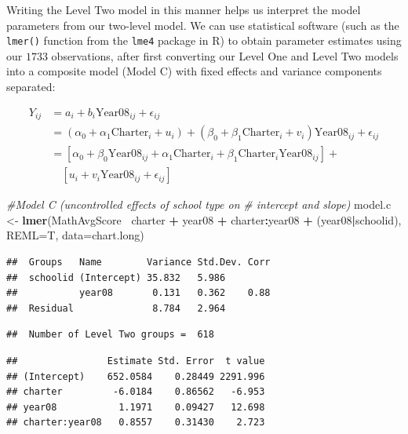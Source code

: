 \documentclass[
]{krantz}
\newenvironment{Shaded}{\begin{snugshade}}{\end{snugshade}}
\newcommand{\CommentTok}[1]{\textcolor[rgb]{0.37,0.37,0.37}{\textit{#1}}}
\newcommand{\DataTypeTok}[1]{\textcolor[rgb]{0.27,0.27,0.27}{#1}}
\newcommand{\KeywordTok}[1]{\textcolor[rgb]{0.27,0.27,0.27}{\textbf{#1}}}
\newcommand{\NormalTok}[1]{#1}
\newcommand{\OperatorTok}[1]{\textcolor[rgb]{0.43,0.43,0.43}{\textbf{#1}}}
\newcommand{\StringTok}[1]{\textcolor[rgb]{0.5,0.5,0.5}{#1}}
\begin{document}
Writing the Level Two model in this manner helps us interpret the model parameters from our two-level model. We can use statistical software (such as the \texttt{lmer()} function from the \texttt{lme4} package in R) to obtain parameter estimates using our \(1733\) observations, after first converting our Level One and Level Two models into a composite model (Model C) with fixed effects and variance components separated:

\begin{align*}
Y_{ij} & = a_{i} + b_{i}\textrm{Year08}_{ij}+ \epsilon_{ij} \\
       & = (\alpha_{0} + \alpha_{1}\textrm{Charter}_i +u_{i}) + (\beta_{0} + \beta_{1}\textrm{Charter}_i + v_{i})\textrm{Year08}_{ij} + \epsilon_{ij} \\
       & = [\alpha_{0} + \beta_{0}\textrm{Year08}_{ij} +\alpha_{1}\textrm{Charter}_i+ \beta_{1}\textrm{Charter}_i\textrm{Year08}_{ij}] + \\
       & \quad [u_{i} + v_{i}\textrm{Year08}_{ij} + \epsilon_{ij}]
\end{align*}

\begin{Shaded}
\begin{Highlighting}[]
\CommentTok{#Model C (uncontrolled effects of school type on }
\CommentTok{#   intercept and slope)}
\NormalTok{model.c <-}\StringTok{ }\KeywordTok{lmer}\NormalTok{(MathAvgScore}\OperatorTok{~}\StringTok{ }\NormalTok{charter }\OperatorTok{+}\StringTok{ }\NormalTok{year08 }\OperatorTok{+}\StringTok{ }
\StringTok{  }\NormalTok{charter}\OperatorTok{:}\NormalTok{year08 }\OperatorTok{+}\StringTok{ }\NormalTok{(year08}\OperatorTok{|}\NormalTok{schoolid), }
  \DataTypeTok{REML=}\NormalTok{T, }\DataTypeTok{data=}\NormalTok{chart.long)}
\end{Highlighting}
\end{Shaded}

\begin{verbatim}
##  Groups   Name        Variance Std.Dev. Corr
##  schoolid (Intercept) 35.832   5.986        
##           year08       0.131   0.362    0.88
##  Residual              8.784   2.964
\end{verbatim}

\begin{verbatim}
##  Number of Level Two groups =  618
\end{verbatim}

\begin{verbatim}
##                Estimate Std. Error  t value
## (Intercept)    652.0584    0.28449 2291.996
## charter         -6.0184    0.86562   -6.953
## year08           1.1971    0.09427   12.698
## charter:year08   0.8557    0.31430    2.723
\end{verbatim}
\end{document}
